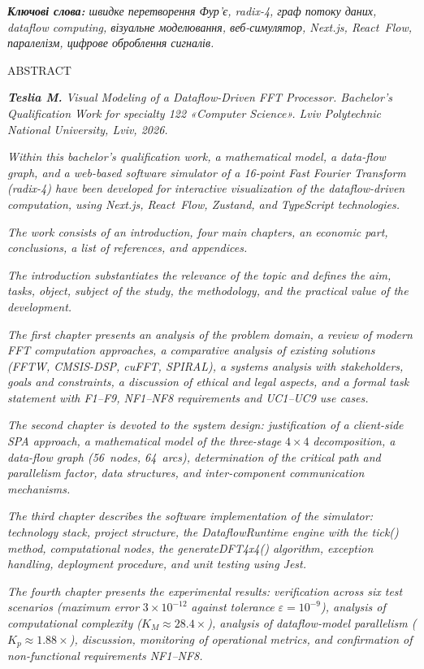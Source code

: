 \documentclass[
]{article}
\begin{document}
\emph{\textbf{Ключові слова:} швидке перетворення Фур'є, radix-4, граф
потоку даних, dataflow computing, візуальне моделювання, веб-симулятор,
Next.js, React~Flow, паралелізм, цифрове оброблення сигналів.}

\protect{}\label{_Toc230130248}{}ABSTRACT

\emph{\textbf{Teslia M.} Visual Modeling of a Dataflow-Driven FFT
Processor. Bachelor's Qualification Work for specialty 122 «Computer
Science». Lviv Polytechnic National University, Lviv, 2026.}

\emph{Within this bachelor's qualification work, a mathematical model, a
data-flow graph, and a web-based software simulator of a 16-point Fast
Fourier Transform (radix-4) have been developed for interactive
visualization of the dataflow-driven computation, using Next.js,
React~Flow, Zustand, and TypeScript technologies.}

\emph{The work consists of an introduction, four main chapters, an
economic part, conclusions, a list of references, and appendices.}

\emph{The introduction substantiates the relevance of the topic and
defines the aim, tasks, object, subject of the study, the methodology,
and the practical value of the development.}

\emph{The first chapter presents an analysis of the problem domain, a
review of modern FFT computation approaches, a comparative analysis of
existing solutions (FFTW, CMSIS-DSP, cuFFT, SPIRAL), a systems analysis
with stakeholders, goals and constraints, a discussion of ethical and
legal aspects, and a formal task statement with F1--F9, NF1--NF8
requirements and UC1--UC9 use cases.}

\emph{The second chapter is devoted to the system design: justification
of a client-side SPA approach, a mathematical model of the three-stage}
\(4 \times 4\) \emph{decomposition, a data-flow graph (56~nodes,
64~arcs), determination of the critical path and parallelism factor,
data structures, and inter-component communication mechanisms.}

\emph{The third chapter describes the software implementation of the
simulator: technology stack, project structure, the DataflowRuntime
engine with the tick() method, computational nodes, the generateDFT4x4()
algorithm, exception handling, deployment procedure, and unit testing
using Jest.}

\emph{The fourth chapter presents the experimental results: verification
across six test scenarios (maximum error} \(3 \times 10^{- 12}\)
\emph{against tolerance} \(\varepsilon = 10^{- 9}\)\emph{), analysis of
computational complexity (}\(K_{M} \approx 28.4 \times\)\emph{),
analysis of dataflow-model parallelism
(}\(K_{p} \approx 1.88 \times\)\emph{), discussion, monitoring of
operational metrics, and confirmation of non-functional requirements
NF1--NF8.}
\end{document}
